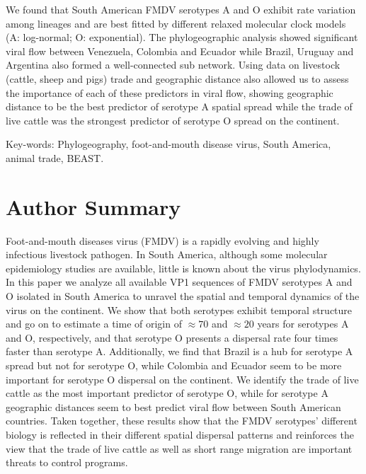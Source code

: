 \documentclass[10pt]{article}
\begin{document}
We found that South American FMDV serotypes A and O exhibit rate variation among lineages and are best fitted by different relaxed molecular clock models (A: log-normal; O: exponential).
The phylogeographic analysis showed significant viral flow between Venezuela, Colombia and Ecuador while Brazil, Uruguay and Argentina also formed a well-connected sub network.
Using data on livestock (cattle, sheep and pigs) trade and geographic distance also allowed us to assess the importance of each of these predictors in viral flow, showing geographic distance to be the best predictor of serotype A spatial spread while the trade of live cattle was the strongest predictor of serotype O spread on the continent.


Key-words: Phylogeography, foot-and-mouth disease virus, South America, animal trade, BEAST.

\section*{Author Summary} %
Foot-and-mouth diseases virus (FMDV) is a rapidly evolving and highly infectious livestock pathogen.
In South America, although some molecular epidemiology studies are available, little is known about the virus phylodynamics.
In this paper we analyze all available VP1 sequences of FMDV serotypes A and O isolated in South America to unravel the spatial and temporal dynamics of the virus on the continent.
We show that both serotypes exhibit temporal structure and go on to estimate a time of origin of $\approx 70$ and $\approx 20$ years for serotypes A and O, respectively, and that serotype O presents a dispersal rate four times faster than serotype A.
Additionally, we find that Brazil is a hub for serotype A spread but not for serotype O, while Colombia and Ecuador seem to be more important for serotype O dispersal on the continent.
We identify the trade of live cattle as the most important predictor of serotype O, while for serotype A geographic distances seem to best predict viral flow between South American countries.
Taken together, these results show that the FMDV serotypes' different biology is reflected in their different spatial dispersal patterns and reinforces the view that the trade of live cattle as well as short range migration are important threats to control programs.   
\end{document}
